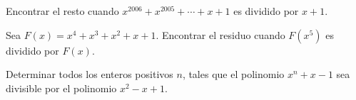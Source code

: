 \begin{section-problem}
    Encontrar el resto cuando $x^{2006} + x^{2005} + \cdots + x + 1$ es dividido por $x + 1$.
\end{section-problem}

\begin{section-problem}
    Sea $F(x) = x^4 + x^3 + x^2 + x + 1$.
    Encontrar el residuo cuando $F(x^5)$ es dividido por $F(x)$.
\end{section-problem}

\begin{section-problem}
    Determinar todos los enteros positivos $n$, tales que el polinomio $x^n + x - 1$ sea divisible por el polinomio $x^2 - x + 1$.
\end{section-problem}
